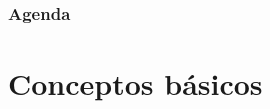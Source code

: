 
\begin{frame}[t,plain]
\titlepage
\end{frame}


 

\watermarkon

\begin{frame}
	\frametitle{Agenda}
	
\end{frame}
\watermarkoff



\section{Conceptos básicos}




